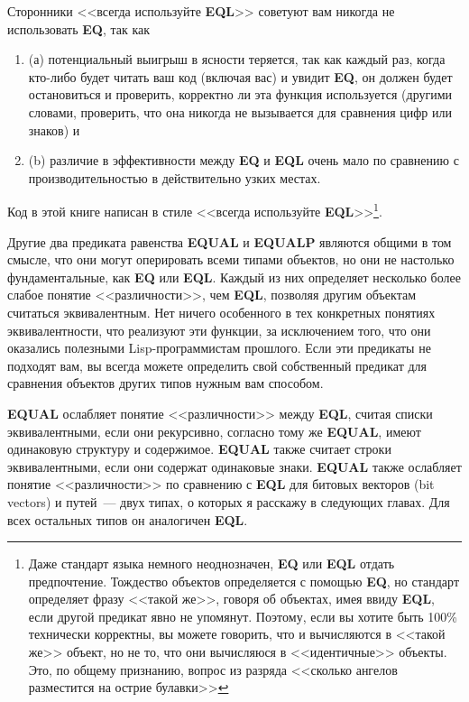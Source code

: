 Сторонники <<всегда используйте \textbf{EQL}>> советуют вам никогда не использовать
\textbf{EQ}, так как

\begin{enumerate}
\item (а) потенциальный выигрыш в ясности теряется, так как каждый раз, когда кто-либо
  будет читать ваш код (включая вас) и увидит \textbf{EQ}, он должен будет остановиться и
  проверить, корректно ли эта функция используется (другими словами, проверить, что она
  никогда не вызывается для сравнения цифр или знаков) и
\item (b) различие в эффективности между \textbf{EQ} и \textbf{EQL} очень мало по
  сравнению с производительностью в действительно узких местах.
\end{enumerate}

Код в этой книге написан в стиле <<всегда используйте \textbf{EQL}>>\footnote{Даже стандарт
  языка немного неоднозначен, \textbf{EQ} или \textbf{EQL} отдать предпочтение. Тождество
  объектов определяется с помощью \textbf{EQ}, но стандарт определяет фразу <<такой же>>,
  говоря об объектах, имея ввиду \textbf{EQL}, если другой предикат явно не
  упомянут. Поэтому, если вы хотите быть 100\% технически корректны, вы можете говорить,
  что  и  вычисляются в <<такой же>> объект, но не то, что они
  вычисляюся в <<идентичные>> объекты. Это, по общему признанию, вопрос из разряда <<сколько
  ангелов разместится на острие булавки>>}.

Другие два предиката равенства \textbf{EQUAL} и \textbf{EQUALP} являются общими в том
смысле, что они могут оперировать всеми типами объектов, но они не настолько
фундаментальные, как \textbf{EQ} или \textbf{EQL}. Каждый из них определяет несколько
более слабое понятие <<различности>>, чем \textbf{EQL}, позволяя другим объектам считаться
эквивалентным. Нет ничего особенного в тех конкретных понятиях эквивалентности, что
реализуют эти функции, за исключением того, что они оказались полезными Lisp-программистам
прошлого. Если эти предикаты не подходят вам, вы всегда можете определить свой собственный
предикат для сравнения объектов других типов нужным вам способом.

\textbf{EQUAL} ослабляет понятие <<различности>> между \textbf{EQL}, считая списки
эквивалентными, если они рекурсивно, согласно тому же \textbf{EQUAL}, имеют одинаковую
структуру и содержимое. \textbf{EQUAL} также считает строки эквивалентными, если они
содержат одинаковые знаки. \textbf{EQUAL} также ослабляет понятие <<различности>> по
сравнению с \textbf{EQL} для битовых векторов (bit vectors) и путей~--- двух типах, о
которых я расскажу в следующих главах. Для всех остальных типов он аналогичен
\textbf{EQL}.

